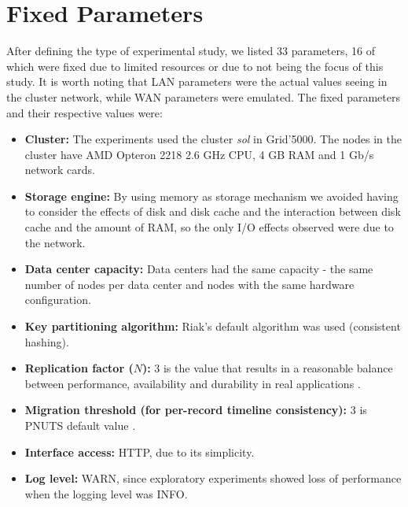 \documentclass[doublespacing]{bmcart}
\begin{document}
\section{Fixed Parameters}

After defining the type of experimental study, we listed 33 parameters, 16
of which were fixed due to limited resources or due to not being the focus
of this study. It is worth noting that LAN parameters were the actual values seeing in the
cluster network, while WAN parameters were emulated. The fixed parameters and their
respective values were:

\begin{itemize}

\item \textbf{Cluster:} The experiments used the cluster \textit{sol} in
Grid'5000. The nodes in the cluster have AMD Opteron 2218 2.6 GHz CPU, 4 GB RAM
and 1 Gb/s network cards.

\item \textbf{Storage engine:} By using memory as storage mechanism we avoided
having to consider the effects of disk and disk cache and the interaction
between disk cache and the amount of RAM, so the only I/O effects observed were
due to the network.

\item \textbf{Data center capacity:} Data centers had the same capacity - the
same number of nodes per data center and nodes with the same hardware
configuration.

\item \textbf{Key partitioning algorithm:} Riak's default algorithm was used
(consistent hashing).

\item \textbf{Replication factor ($ N $):} 3 is the value that results in a
reasonable balance between performance, availability and durability in real
applications \cite{DeCandia2007}.

\item \textbf{Migration threshold (for per-record timeline consistency):} 3 is PNUTS
default value \cite{Cooper2008}.

\item \textbf{Interface access:} HTTP, due to its simplicity.

\item \textbf{Log level:} WARN, since exploratory experiments showed loss of
performance when the logging level was INFO.


\end{itemize}
\end{document}
